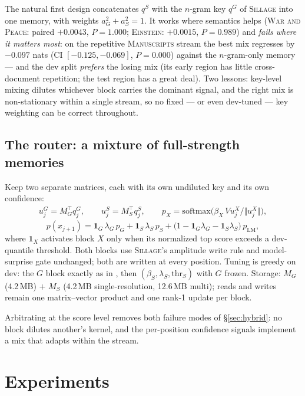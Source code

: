 \documentclass[11pt]{article}
\newcommand{\sillage}{\textsc{Sillage}}
\begin{document}
The natural first design concatenates $q^S$ with the $n$-gram key $q^G$ of \sillage{} into one memory, with weights $a_G^2 + a_S^2 = 1$. It works where semantics helps (\textsc{War and Peace}: paired $+0.0043$, $P{=}1.000$; \textsc{Einstein}: $+0.0015$, $P{=}0.989$) and \emph{fails where it matters most}: on the repetitive \textsc{Manuscripts} stream the best mix regresses by $\mathbf{-0.097}$ nats (CI $[-0.125, -0.069]$, $P{=}0.000$) against the $n$-gram-only memory --- and the dev split \emph{prefers} the losing mix (its early region has little cross-document repetition; the test region has a great deal). Two lessons: key-level mixing dilutes whichever block carries the dominant signal, and the right mix is non-stationary within a single stream, so no fixed --- or even dev-tuned --- key weighting can be correct throughout.

\subsection{The router: a mixture of full-strength memories}\label{sec:router}

Keep two separate matrices, each with its own undiluted key and its own confidence:
\begin{align}
u^G_j = M_G^{\top} q^G_j,\qquad u^S_j = M_S^{\top} q^S_j,\qquad
p_X = \mathrm{softmax}\big(\beta_X\, V u^X_j / \Vert u^X_j\Vert\big),
\end{align}
\begin{equation}
p(x_{j+1}) = \mathbf{1}_G\, \lambda_G\, p_G + \mathbf{1}_S\, \lambda_S\, p_S
 + \big(1 - \mathbf{1}_G \lambda_G - \mathbf{1}_S \lambda_S\big)\, p_{\mathrm{LM}},
\end{equation}
where $\mathbf{1}_X$ activates block $X$ only when its normalized top score exceeds a dev-quantile threshold. Both blocks use \sillage's amplitude write rule and model-surprise gate unchanged; both are written at every position. Tuning is greedy on dev: the $G$ block exactly as in \cite{sillage}, then $(\beta_S, \lambda_S, \text{thr}_S)$ with $G$ frozen. Storage: $M_G$ (4.2\,MB) $+$ $M_S$ (4.2\,MB single-resolution, 12.6\,MB multi); reads and writes remain one matrix--vector product and one rank-1 update per block.

Arbitrating at the score level removes both failure modes of \S\ref{sec:hybrid}: no block dilutes another's kernel, and the per-position confidence signals implement a mix that adapts within the stream.

\section{Experiments}\label{sec:results}
\end{document}

